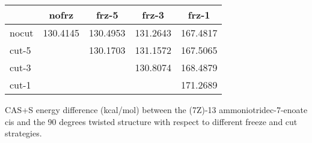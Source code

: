 \begin{center}
\begin{threeparttable}
\begin{tabular}{lcccc}
\hline
			&		nofrz			&	frz-5				&	frz-3				&	frz-1	\\
\hline
nocut		&	130.4145        	&	130.4953        	&	131.2643        	&	167.4817         \\
cut-5		&						&	130.1703        	&	131.1572        	&	167.5065         \\
cut-3		&						&						&	130.8074        	&	168.4879         \\
cut-1		&						&						&						&	171.2689       	\\
\hline
\end{tabular}
\caption{\footnotesize CAS+S energy difference (kcal/mol) between the (7Z)-13
ammoniotridec-7-enoate cis and the 90 degrees twisted structure with respect
to different freeze and cut strategies.}
\label{tbl:7Z-diff-cis-90}
\end{threeparttable}
\end{center}
